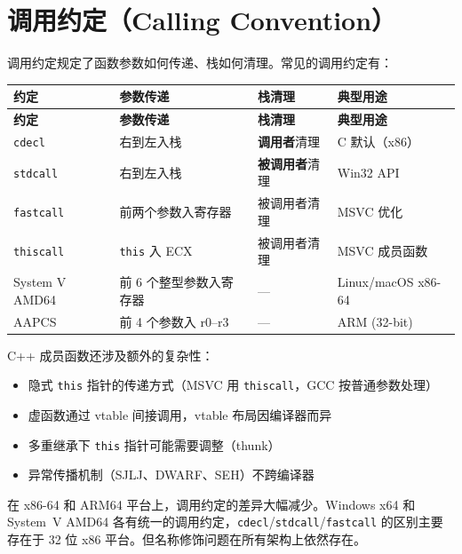\documentclass[12pt,a4paper,fontset=fandol]{ctexbook}
\newcommand{\cpp}[1]{C++#1}
\begin{document}
\section{调用约定（Calling Convention）}

调用约定规定了函数参数如何传递、栈如何清理。常见的调用约定有：

\begin{longtable}{l>{\raggedright\arraybackslash}p{3cm}>{\raggedright\arraybackslash}p{4cm}>{\raggedright\arraybackslash}p{3cm}}
\toprule
\textbf{约定} & \textbf{参数传递} & \textbf{栈清理} & \textbf{典型用途} \\
\midrule
\endfirsthead
\toprule
\textbf{约定} & \textbf{参数传递} & \textbf{栈清理} & \textbf{典型用途} \\
\midrule
\endhead
\texttt{cdecl}     & 右到左入栈 & \textbf{调用者}清理 & C 默认（x86） \\
\texttt{stdcall}   & 右到左入栈 & \textbf{被调用者}清理 & Win32 API \\
\texttt{fastcall}  & 前两个参数入寄存器 & 被调用者清理 & MSVC 优化 \\
\texttt{thiscall}  & \texttt{this} 入 ECX & 被调用者清理 & MSVC 成员函数 \\
System V AMD64 & 前 6 个整型参数入寄存器 & --- & Linux/macOS x86-64 \\
AAPCS & 前 4 个参数入 r0--r3 & --- & ARM (32-bit) \\
\bottomrule
\end{longtable}

\cpp{} 成员函数还涉及额外的复杂性：
\begin{itemize}[nosep]
\item 隐式 \texttt{this} 指针的传递方式（MSVC 用 \texttt{thiscall}，GCC 按普通参数处理）
\item 虚函数通过 vtable 间接调用，vtable 布局因编译器而异
\item 多重继承下 \texttt{this} 指针可能需要调整（thunk）
\item 异常传播机制（SJLJ、DWARF、SEH）不跨编译器
\end{itemize}

\begin{tcolorbox}[note={x86-64 下的简化}]
在 x86-64 和 ARM64 平台上，调用约定的差异大幅减少。Windows x64 和 System~V AMD64 各有统一的调用约定，\texttt{cdecl}/\allowbreak{}\texttt{stdcall}/\allowbreak{}\texttt{fastcall} 的区别主要存在于 32 位 x86 平台。但名称修饰问题在所有架构上依然存在。
\end{tcolorbox}
\end{document}

